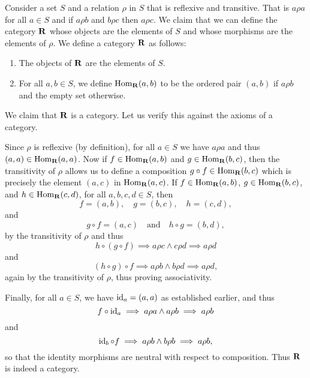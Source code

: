 \begin{example}
    \label{ex:category-from-set-relation}
    Consider a set \(S\) and a relation \(\rho\) in \(S\) that is reflexive and
    transitive. That is \(a\rho a\) for all \(a \in S\) and if \(a\rho b\) and
    \(b\rho c\) then \(a\rho c\). We claim that we can define the category
    \(\mathbf{R}\) whose objects are the elements of \(S\) and whose morphisms are
    the elements of \(\rho\). We define a category \(\mathbf{R}\) as follows:
    \begin{enumerate}[label=(\alph*), itemsep=0pt]
        \item The objects of \(\mathbf{R}\) are the elements of \(S\).
        \item For all \(a, b \in S\), we define \(\operatorname{Hom}_{\mathbf{R}}(a, b)\) to be
        the ordered pair \((a, b)\) if \(a\rho b\) and the empty set otherwise.
    \end{enumerate}
    We claim that \(\mathbf{R}\) is a category. Let us verify this against the
    axioms of a category.

    Since \(\rho\) is reflexive (by definition), for all \(a \in S\) we have
    \(a\rho a\) and thus \((a, a) \in \operatorname{Hom}_{\mathbf{R}}(a, a)\). Now if \(f \in
    \operatorname{Hom}_{\mathbf{R}}(a, b)\) and \(g \in \operatorname{Hom}_{\mathbf{R}}(b, c)\), then the
    transitivity of \(\rho\) allows us to define a composition \(g \circ f \in
    \operatorname{Hom}_{\mathbf{R}}(b, c)\) which is precisely the element \((a, c)\) in
    \(\operatorname{Hom}_{\mathbf{R}}(a, c)\). If \(f \in \operatorname{Hom}_{\mathbf{R}}(a, b)\), \(g \in
    \operatorname{Hom}_{\mathbf{R}}(b, c)\), and \(h \in \operatorname{Hom}_{\mathbf{R}}(c, d)\), for all \(a,
    b, c, d \in S\), then 
    \[
        f = (a, b), \quad g = (b, c), \quad h = (c, d),
    \]
    and
    \[
        g \circ f = (a, c)\quad \text{and}\quad h \circ g = (b, d),
    \]
    by the transitivity of \(\rho\) and thus
    \[
        h \circ (g \circ f) \implies a \rho c \land c \rho d \implies a \rho d
    \]
    and
    \[
        (h \circ g) \circ f \implies a \rho b \land b \rho d \implies a \rho d,
    \]
    again by the transitivity of \(\rho\), thus proving associativity.

    Finally, for all \(a \in S\), we have \(\operatorname{id}_a = (a, a)\) as established
    earlier, and thus
    \[
        f \circ \operatorname{id}_a \implies a \rho a \land a \rho b \implies a \rho b
    \]
    and
    \[
        \operatorname{id}_b \circ f \implies a \rho b \land b \rho b \implies a \rho b,
    \]
    so that the identity morphisms are neutral with respect to composition. Thus
    \(\mathbf{R}\) is indeed a category.


\end{example}
